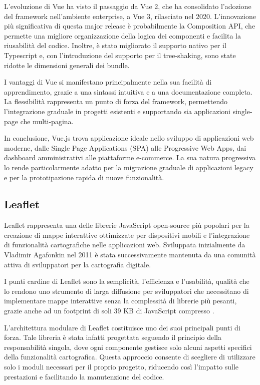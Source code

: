 L'evoluzione di Vue ha visto il passaggio da Vue 2, che ha consolidato l'adozione del framework nell'ambiente enterprise, a Vue 3, rilasciato nel 2020. L'innovazione più significativa di questa major release è probabilmente la Composition API, che permette una migliore organizzazione della logica dei componenti e facilita la riusabilità del codice. Inoltre, è stato migliorato il supporto nativo per il Typescript e, con l'introduzione del supporto per il tree-shaking, sono state ridotte le dimensioni generali dei bundle.

I vantaggi di Vue si manifestano principalmente nella sua facilità di apprendimento, grazie a una sintassi intuitiva e a una documentazione completa. La flessibilità rappresenta un punto di forza del framework, permettendo l'integrazione graduale in progetti esistenti e supportando sia applicazioni single-page che multi-pagina.

In conclusione, Vue.js trova applicazione ideale nello sviluppo di applicazioni web moderne, dalle Single Page Applications (SPA) alle Progressive Web Apps, dai dashboard amministrativi alle piattaforme e-commerce. La sua natura progressiva lo rende particolarmente adatto per la migrazione graduale di applicazioni legacy e per la prototipazione rapida di nuove funzionalità.

\subsection{Leaflet}

Leaflet rappresenta una delle librerie JavaScript open-source più popolari per la creazione di mappe interattive ottimizzate per dispositivi mobili e l'integrazione di funzionalità cartografiche nelle applicazioni web. Sviluppata inizialmente da Vladimir Agafonkin nel 2011 \cite{agafonkin2011leaflet} è stata successivamente mantenuta da una comunità attiva di sviluppatori per la cartografia digitale.

I punti cardine di Leaflet sono la semplicità, l'efficienza e l'usabilità, qualità che lo rendono uno strumento di larga diffusione per sviluppatori che necessitano di implementare mappe interattive senza la complessità di librerie più pesanti, grazie anche ad un footprint di soli 39 KB di JavaScript compresso \cite{leafletnpm2024}.

L'architettura modulare di Leaflet costituisce uno dei suoi principali punti di forza. Tale libreria è stata infatti progettata seguendo il principio della responsabilità singola, dove ogni componente gestisce solo alcuni aspetti specifici della funzionalità cartografica. Questa approccio consente di scegliere di utilizzare solo i moduli necessari per il proprio progetto, riducendo così l'impatto sulle prestazioni e facilitando la manutenzione del codice.

